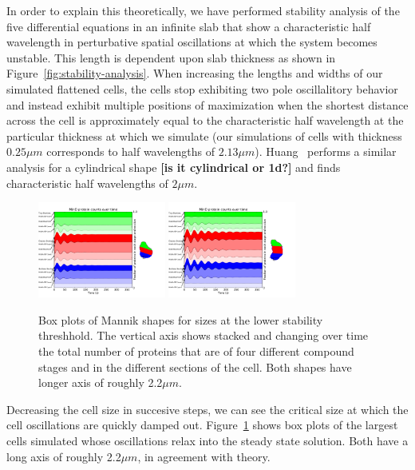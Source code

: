 \documentclass[letterpaper,twocolumn,amsmath,amssymb,pre]{revtex4-1}
\newcommand{\red}[1]{{\bf \color{red} #1}}
\newcommand{\fixme}[1]{\red{[#1]}}
\begin{document}
In order to explain this theoretically, we have performed stability
analysis of the five differential equations in an infinite slab that
show a characteristic half wavelength in perturbative spatial
oscillations at which the system becomes unstable.  This length is
dependent upon slab thickness as shown in
Figure~\ref{fig:stability-analysis}.  When increasing the lengths and
widths of our simulated flattened cells, the cells stop exhibiting two
pole oscillalitory behavior and instead exhibit multiple
positions of maximization when the shortest distance across the cell
is approximately equal to the characteristic half wavelength at the
particular thickness at which we simulate (our simulations of cells
with thickness $0.25\mu m$ corresponds to half wavelengths of $2.13\mu
m$).  Huang~\cite{huang2003dynamic} performs a similar analysis for a
cylindrical shape \fixme{is it cylindrical or 1d?} and finds
characteristic half wavelengths of $2\mu m$.

\begin{figure}
  \includegraphics[width=4.2cm]{../data/shape-randst/plots/box-plot_D--randst-25-800-800-9500-1500}
  \includegraphics[width=4.2cm]{../data/shape-randst/plots/box-plot_D--randst-25-1000-1700-9400-1500}
  \caption{Box plots of Mannik shapes for sizes at the lower stability
    threshhold.  The vertical axis shows stacked and changing over
    time the total number of proteins that are of four different
    compound stages and in the different sections of the cell.  Both
    shapes have longer axis of roughly 2.2$\mu m$.}
  \label{box-mannik}
\end{figure}

Decreasing the cell size in succesive steps, we can see the critical
size at which the cell oscillations are quickly damped out.
Figure~\ref{box-mannik} shows box plots of the largest cells simulated
whose oscillations relax into the steady state solution.  Both have a
long axis of roughly 2.2$\mu m$, in agreement with theory.
\end{document}

